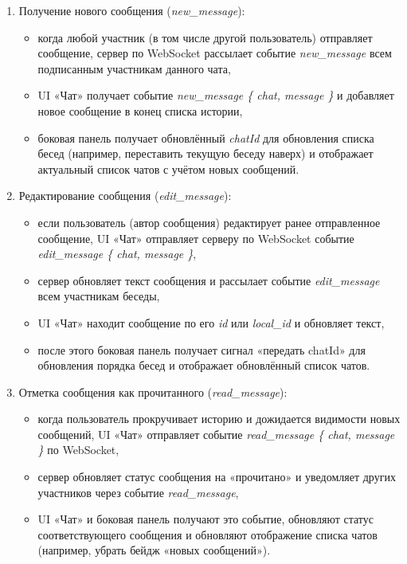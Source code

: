 \begin{enumerate}
    \item Получение нового сообщения (\textit{new\_message}):
    \begin{itemize}
        \item когда любой участник (в том числе другой пользователь) отправляет сообщение, сервер по WebSocket рассылает событие \textit{new\_message} всем подписанным участникам данного чата,
        \item UI «Чат» получает событие \textit{new\_message \{ chat, message \}} и добавляет новое сообщение в конец списка истории,
        \item боковая панель получает обновлённый \textit{chatId} для обновления списка бесед (например, переставить текущую беседу наверх) и отображает актуальный список чатов с учётом новых сообщений.
    \end{itemize}

    \item Редактирование сообщения (\textit{edit\_message}):
    \begin{itemize}
        \item если пользователь (автор сообщения) редактирует ранее отправленное сообщение, UI «Чат» отправляет серверу по WebSocket событие \textit{edit\_message \{ chat, message \}},
        \item сервер обновляет текст сообщения и рассылает событие \textit{edit\_message} всем участникам беседы,
        \item UI «Чат» находит сообщение по его \textit{id} или \textit{local\_id} и обновляет текст,
        \item после этого боковая панель получает сигнал «передать chatId» для обновления порядка бесед и отображает обновлённый список чатов.
    \end{itemize}

    \item Отметка сообщения как прочитанного (\textit{read\_message}):
    \begin{itemize}
        \item когда пользователь прокручивает историю и дожидается видимости новых сообщений, UI «Чат» отправляет событие \textit{read\_message \{ chat, message \}} по WebSocket,
        \item сервер обновляет статус сообщения на «прочитано» и уведомляет других участников через событие \textit{read\_message},
        \item UI «Чат» и боковая панель получают это событие, обновляют статус соответствующего сообщения и обновляют отображение списка чатов (например, убрать бейдж «новых сообщений»).
    \end{itemize}


\end{enumerate}
